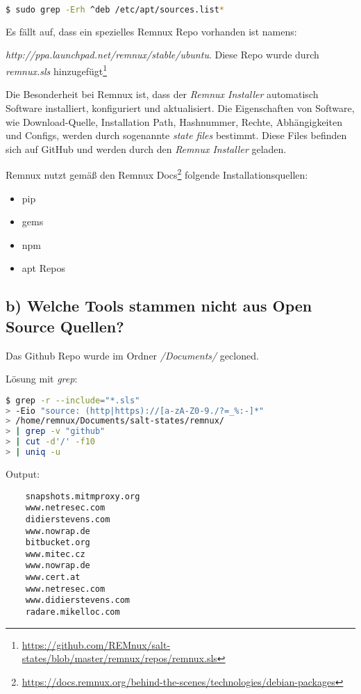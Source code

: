 \begin{lstlisting}[language=bash]
  $ sudo grep -Erh ^deb /etc/apt/sources.list*
\end{lstlisting}
Es fällt auf, dass ein spezielles Remnux Repo vorhanden ist namens:

\mbox{\textit{http://ppa.launchpad.net/remnux/stable/ubuntu}}. Diese Repo wurde durch \textit{remnux.sls} hinzugefügt\footnote{\url{https://github.com/REMnux/salt-states/blob/master/remnux/repos/remnux.sls}}

Die Besonderheit bei Remnux ist, dass der \textit{Remnux Installer} automatisch Software installiert, konfiguriert und aktualisiert.
Die Eigenschaften von Software, wie Download-Quelle, Installation Path, Hashnummer, Rechte, Abhängigkeiten und Configs, werden durch sogenannte \textit{state files} bestimmt.
Diese Files befinden sich auf GitHub und werden durch den \textit{Remnux Installer} geladen.

Remnux nutzt gemäß den Remnux Docs\footnote{\url{https://docs.remnux.org/behind-the-scenes/technologies/debian-packages}} folgende Installationsquellen:
\begin{itemize}
    \item pip
    \item gems
    \item npm
    \item apt Repos
\end{itemize}

\subsection*{b) Welche Tools stammen nicht aus Open Source Quellen?}

Das Github Repo wurde im Ordner \textit{/Documents/} gecloned.

Lösung mit \textit{grep}:

\begin{lstlisting}[language=bash]
$ grep -r --include="*.sls"
> -Eio "source: (http|https)://[a-zA-Z0-9./?=_%:-]*"
> /home/remnux/Documents/salt-states/remnux/
> | grep -v "github"
> | cut -d'/' -f10
> | uniq -u
\end{lstlisting}

Output:
\begin{lstlisting}
    snapshots.mitmproxy.org
    www.netresec.com
    didierstevens.com
    www.nowrap.de
    bitbucket.org
    www.mitec.cz
    www.nowrap.de
    www.cert.at
    www.netresec.com
    www.didierstevens.com
    radare.mikelloc.com
\end{lstlisting}

